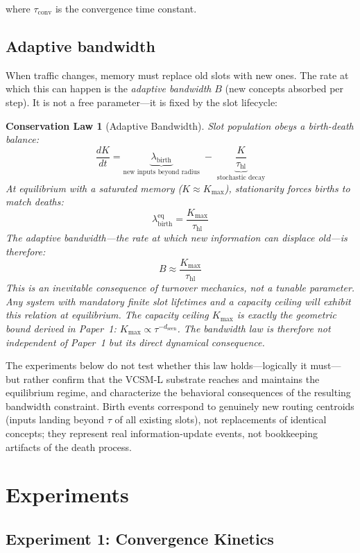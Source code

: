 \documentclass[11pt]{article}
\newtheorem{conservationlaw}[theorem]{Conservation Law}
\begin{document}
where $\tau_{\text{conv}}$ is the convergence time constant.

\subsection{Adaptive bandwidth}
\label{sec:bandwidth_law}

When traffic changes, memory must replace old slots with new ones.
The rate at which this can happen is the \textit{adaptive bandwidth} $B$ (new concepts absorbed per step).
It is not a free parameter---it is fixed by the slot lifecycle:

\begin{conservationlaw}[Adaptive Bandwidth]
\label{law:bandwidth}
Slot population obeys a birth-death balance:
\[
  \frac{dK}{dt} = \underbrace{\lambda_{\text{birth}}}_{\text{new inputs beyond radius}} \;-\; \underbrace{\frac{K}{\tau_{\text{hl}}}}_{\text{stochastic decay}}
\]
At equilibrium with a saturated memory ($K \approx K_{\max}$), stationarity forces births to match deaths:
\[
  \lambda_{\text{birth}}^{\text{eq}} = \frac{K_{\max}}{\tau_{\text{hl}}}
\]
The adaptive bandwidth---the rate at which new information can displace old---is therefore:
\[
  \boxed{B \approx \frac{K_{\max}}{\tau_{\text{hl}}}}
\]
This is an inevitable consequence of turnover mechanics, not a tunable parameter.
Any system with mandatory finite slot lifetimes and a capacity ceiling will exhibit this relation at equilibrium.
The capacity ceiling $K_{\max}$ is exactly the geometric bound derived in Paper~1: $K_{\max} \propto \tau^{-d_{\text{seen}}}$. The bandwidth law is therefore not independent of Paper~1 but its direct dynamical consequence.
\end{conservationlaw}

\noindent The experiments below do not test whether this law holds---logically it must---but rather confirm that the VCSM-L substrate reaches and maintains the equilibrium regime, and characterize the behavioral consequences of the resulting bandwidth constraint. Birth events correspond to genuinely new routing centroids (inputs landing beyond $\tau$ of all existing slots), not replacements of identical concepts; they represent real information-update events, not bookkeeping artifacts of the death process.

\section{Experiments}

\subsection{Experiment 1: Convergence Kinetics}
\end{document}
